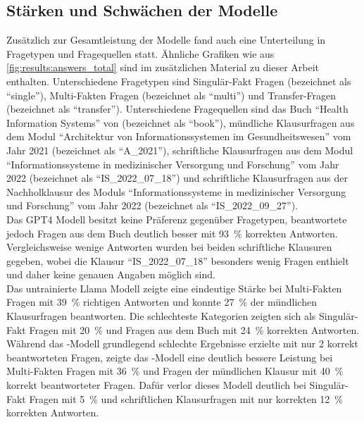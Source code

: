 \subsection{Stärken und Schwächen der Modelle}
Zusätzlich zur Gesamtleistung der Modelle fand auch eine Unterteilung in Fragetypen und Fragequellen statt.
Ähnliche Grafiken wie aus \cref{fig:results:answers_total} sind im zusätzlichen Material zu dieser Arbeit enthalten.
Unterschiedene Fragetypen sind Singulär-Fakt Fragen (bezeichnet als \enquote{single}), Multi-Fakten Fragen (bezeichnet als \enquote{multi}) und Transfer-Fragen (bezeichnet als \enquote{transfer}).
Unterschiedene Fragequellen sind das Buch \enquote{Health Information Systems} von \citet{bb} (bezeichnet als \enquote{book}),
mündliche Klausurfragen aus dem Modul \enquote{Architektur von Informationssystemen im Gesundheitswesen} vom Jahr 2021 (bezeichnet als \enquote{A\_2021}),
schriftliche Klausurfragen aus dem Modul \enquote{Informationssysteme in medizinischer Versorgung und Forschung} vom Jahr 2022 (bezeichnet als \enquote{IS\_2022\_07\_18})
und schriftliche Klausurfragen aus der Nachholklausur des Moduls \enquote{Informationssysteme in medizinischer Versorgung und Forschung} vom Jahr 2022 (bezeichnet als \enquote{IS\_2022\_09\_27}).\\

Das GPT4 Modell besitzt keine Präferenz gegenüber Fragetypen, beantwortete jedoch Fragen aus dem Buch deutlich besser mit \SI{93}{\percent} korrekten Antworten.
Vergleichsweise wenige Antworten wurden bei beiden schriftliche Klausuren gegeben, wobei die Klausur \enquote{IS\_2022\_07\_18} besonders wenig Fragen enthielt und daher keine genauen Angaben möglich sind.\\

Das untrainierte Llama Modell zeigte eine eindeutige Stärke bei Multi-Fakten Fragen mit \SI{39}{\percent} richtigen Antworten und konnte \SI{27}{\percent} der mündlichen Klausurfragen beantworten.
Die schlechteste Kategorien zeigten sich als Singulär-Fakt Fragen mit \SI{20}{\percent} und Fragen aus dem Buch mit \SI{24}{\percent} korrekten Antworten.\\

Während das \liv-Modell grundlegend schlechte Ergebnisse erzielte mit nur 2 korrekt beantworteten Fragen,
zeigte das \lia-Modell eine deutlich bessere Leistung bei Multi-Fakten Fragen mit \SI{36}{\percent}
und Fragen der mündlichen Klausur mit \SI{40}{\percent} korrekt beantworteter Fragen.
Dafür verlor dieses Modell deutlich bei Singulär-Fakt Fragen mit \SI{5}{\percent} und schriftlichen Klausurfragen mit nur korrekten \SI{12}{\percent} korrekten Antworten.\\

